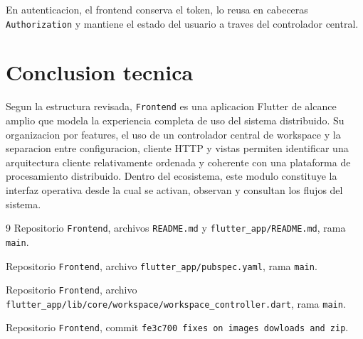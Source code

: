 \documentclass[conference]{IEEEtran}
\begin{document}
En autenticacion, el frontend conserva el token, lo reusa en cabeceras \texttt{Authorization} y mantiene el estado del usuario a traves del controlador central.

\section{Conclusion tecnica}
Segun la estructura revisada, \texttt{Frontend} es una aplicacion Flutter de alcance amplio que modela la experiencia completa de uso del sistema distribuido. Su organizacion por features, el uso de un controlador central de workspace y la separacion entre configuracion, cliente HTTP y vistas permiten identificar una arquitectura cliente relativamente ordenada y coherente con una plataforma de procesamiento distribuido. Dentro del ecosistema, este modulo constituye la interfaz operativa desde la cual se activan, observan y consultan los flujos del sistema.

\begin{thebibliography}{9}
Repositorio \texttt{Frontend}, archivos \texttt{README.md} y \texttt{flutter\_app/README.md}, rama \texttt{main}.

Repositorio \texttt{Frontend}, archivo \texttt{flutter\_app/pubspec.yaml}, rama \texttt{main}.

Repositorio \texttt{Frontend}, archivo \texttt{flutter\_app/lib/core/workspace/workspace\_controller.dart}, rama \texttt{main}.

Repositorio \texttt{Frontend}, commit \texttt{fe3c700 fixes on images dowloads and zip}.
\end{thebibliography}
\end{document}
